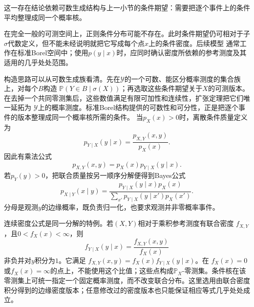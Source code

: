 这一存在结论依赖可数生成结构与上一小节的条件期望：需要把逐个事件上的条件平均整理成同一个概率核。

在完全一般的可测空间上，正则条件分布可能不存在。此时条件期望仍可相对于子\(\sigma\)代数定义，但不能未经说明就把它写成每个点\(x\)上的条件密度。后续模型
通常工作在标准Borel空间中；使用\(p(y\mid x)\)时，应同时确认密度所依赖的参考测度及其适用的几乎处处范围。

构造思路可以从可数生成族看清。先在\(\mathcal{Y}\)的一个可数、能区分概率测度的集合族上，对每个\(B\)构造
\(\mathbb{P}(Y\in B\mid\sigma(X))\)；再选取这些条件期望关于\(X\)的可测版本。在去掉一个共同零测集后，这些数值满足有限可加性和连续性，扩张定理把它们唯一延拓为
\(\mathcal{Y}\)上的概率测度。标准Borel结构提供的可数性和可分性，正是把逐个事件的版本整理成同一个概率核所需的条件。
当\(p_X(x)>0\)时，离散条件质量定义为
\[ p_{Y\mid X}(y\mid x)
  =\frac{p_{X,Y}(x,y)}{p_X(x)}. \]
因此有乘法公式
\[ p_{X,Y}(x,y)=p_X(x)p_{Y\mid X}(y\mid x). \]
若\(p_Y(y)>0\)，把联合质量按另一顺序分解便得到Bayes公式
\begin{equation}
  p_{X\mid Y}(x\mid y)
  =
  \frac{p_{Y\mid X}(y\mid x)p_X(x)}
       {\sum_{x'}p_{Y\mid X}(y\mid x')p_X(x')}.
  \label{eq:probability-discrete-bayes}
\end{equation}
分母是观测\(y\)的边缘概率，既负责归一化，也要求观测并非零概率事件。

连续密度公式是同一分解的特例。若\((X,Y)\)相对于乘积参考测度有联合密度
\(f_{X,Y}\)，且\(0<f_X(x)<\infty\)，则
\[
  f_{Y\mid X}(y\mid x)
  =\frac{f_{X,Y}(x,y)}{f_X(x)}
\]
非负并对\(y\)积分为\(1\)。它满足
\(f_{X,Y}(x,y)=f_X(x)f_{Y\mid X}(y\mid x)\)。在
\(f_X(x)=0\)或\(f_X(x)=\infty\)的点上，不能使用这个比值；这些点构成\(\mathbb P_X\)-零测集。条件核在该零测集上可统一指定一个固定概率测度，而不改变联合分布。这里选用由联合密度积分得到的边缘密度版本；任意修改过的密度版本也只能保证相应等式几乎处处成立。

